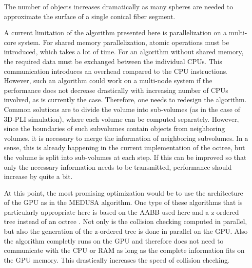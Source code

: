The number of objects increases dramatically as many spheres are needed to approximate the surface of a single conical fiber segment.
\par
% 
A current limitation of the algorithm presented here is parallelization on a multi-core system.
For shared memory parallelization, atomic operations must be introduced, which takes a lot of time.
For an algorithm without shared memory, the required data must be exchanged between the individual CPUs. 
This communication introduces an overhead compared to the \ac{CPU} instructions.
However, such an algorithm could work on a multi-node system if the performance does not decrease drastically with increasing number of CPUs involved, as is currently the case.
Therefore, one needs to redesign the algorithm.
Common solutions are to divide the volume into sub-volumes (as in the case of \ac{3D-PLI} simulation), where each volume can be computed separately.
However, since the boundaries of such subvolumes contain objects from neighboring volumes, it is necessary to merge the information of neighboring subvolumes.
In a sense, this is already happening in the current implementation of the octree, but the volume is split into sub-volumes at each step.
If this can be improved so that only the necessary information needs to be transmitted, performance should increase by quite a bit.
\par
% 
At this point, the most promising optimization would be to use the architecture of the \ac{GPU} as in the \ac{MEDUSA} algorithm.
One type of these algorithms that is particularly appropriate here is based on the \ac{AABB} used here and a z-ordered tree instead of an octree \cite{Karras2012}.
Not only is the collision checking computed in parallel, but also the generation of the z-ordered tree is done in parallel on the \ac{GPU}.
Also the algorithm completly runs on the \ac{GPU} and therefore does not need to communicate with the \ac{CPU} or \ac{RAM} as long as the complete information fits on the \ac{GPU} memory.
This drastically increases the speed of collision checking.
% 
% 
% 
